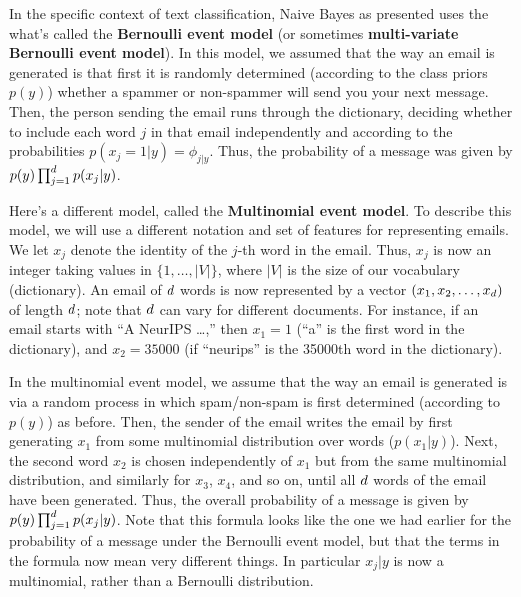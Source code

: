 \documentclass{article}
\begin{document}
In the specific context of text classification, Naive Bayes as presented uses the what's
called the {\bf Bernoulli event model} (or sometimes {\bf multi-variate Bernoulli event model}).  In this model, we assumed that the
way an email is generated is that first it is randomly determined (according to the class
priors $p(y)$) whether a spammer or non-spammer will send you your next message.  Then,
the person sending the email runs through the dictionary, deciding whether to include each word $j$
in that email independently and according to the probabilities $p(x_j=1|y) = \phi_{j|y}$.  Thus,
the probability of a message was given by $p(y) \prod_{j=1}^{d} p(x_j|y)$.

Here's a different model, called the {\bf Multinomial event model}.  To describe this model, we
will use a different notation and set of features for representing emails.  We let $x_j$ denote the identity
of the $j$-th word in the email.  Thus, $x_j$ is now an integer taking values in $\{1,\ldots, |V|\}$,
where $|V|$ is the size of our vocabulary (dictionary).  An email of ${d}$ words
is now represented by a vector $(x_1, x_2, \ldots, x_{{d}})$ of length ${d}$; note that ${d}$ can
vary for different documents.  For instance, if an email starts with ``A NeurIPS \dots,'' then
$x_1=1$ (``a'' is the first word in the dictionary), and $x_2 = 35000$ (if ``neurips'' is the
35000th word in the dictionary).

In the multinomial event model, we assume that the way an email is generated is via
a random process in which spam/non-spam is first determined (according to $p(y)$) as before.  Then,
the sender of the email writes the email by first generating $x_1$ from some multinomial
distribution over words ($p(x_1|y)$).  Next, the second word $x_2$ is chosen independently
of $x_1$ but from the same multinomial distribution, and similarly for $x_3$, $x_4$, and so on, until
all ${d}$ words of the email have been generated.
Thus, the overall probability of a message is given by $p(y) \prod_{j=1}^{d} p(x_j|y)$.  Note
that this formula looks like the one we had earlier for the probability of a message under the
Bernoulli event model, but that the terms in the formula now mean very different things.
In particular $x_j|y$ is now a multinomial, rather than a Bernoulli distribution.

\end{document}
